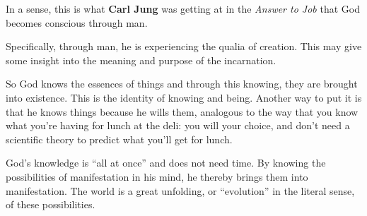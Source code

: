 In a sense, this is what \textbf{Carl Jung} was getting at in the \emph{Answer to Job} that God becomes conscious through man.

Specifically, through man, he is experiencing the qualia of creation. This may give some insight into the meaning and purpose of the incarnation.

So God knows the essences of things and through this knowing, they are brought into existence. This is the identity of knowing and being. Another way to put it is that he knows things because he wills them, analogous to the way that you know what you're having for lunch at the deli: you will your choice, and don't need a scientific theory to predict what you'll get for lunch.

God's knowledge is ``all at once'' and does not need time. By knowing the possibilities of manifestation in his mind, he thereby brings them into manifestation. The world is a great unfolding, or ``evolution'' in the literal sense, of these possibilities.


